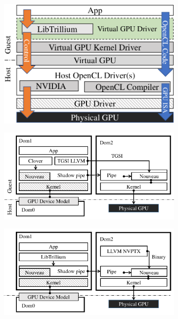 
\begin{figure}[!th]
	\centering
	\begin{subfigure}{.6\columnwidth}
		\includegraphics[width=\columnwidth,trim={0cm 0cm 0cm 0cm},clip]{trillium/images/design/trillium_design.pdf}
		\caption{{}}
		\label{fig_trillium}
	\end{subfigure}\hfill
	\begin{subfigure}{.72\columnwidth}
		\includegraphics[width=\columnwidth,trim={0 0 0 0},clip]{trillium/images/design/xen-svga.pdf}
		\caption{{}}
		\label{fig_trillium_classic}
	\end{subfigure}\hfill
	\begin{subfigure}{.68\columnwidth}
		\includegraphics[width=\columnwidth,trim={0.6cm 0 0 0},clip]{trillium/images/design/trillium.pdf}

\end{subfigure}
\end{figure}

